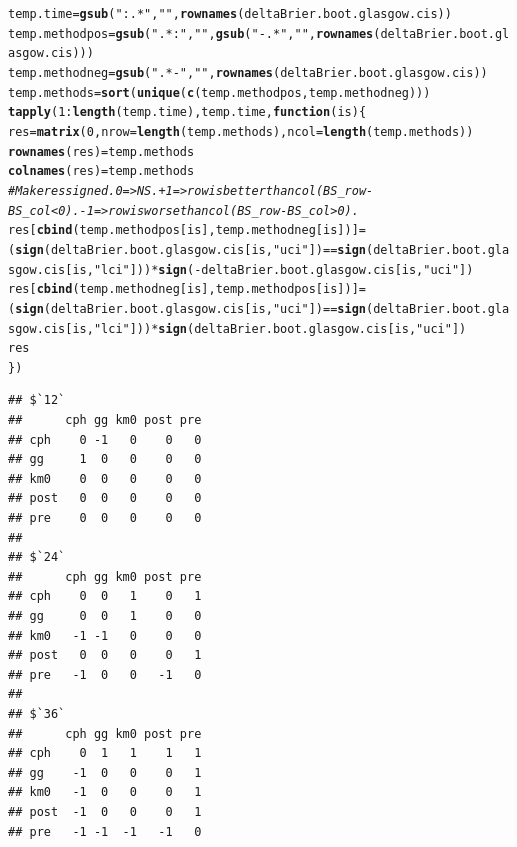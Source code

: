 \documentclass{article}\usepackage[]{graphicx}\usepackage[]{color}
\makeatletter
\newcommand{\hlnum}[1]{\textcolor[rgb]{0.686,0.059,0.569}{#1}}%
\newcommand{\hlstr}[1]{\textcolor[rgb]{0.192,0.494,0.8}{#1}}%
\newcommand{\hlcom}[1]{\textcolor[rgb]{0.678,0.584,0.686}{\textit{#1}}}%
\newcommand{\hlopt}[1]{\textcolor[rgb]{0,0,0}{#1}}%
\newcommand{\hlstd}[1]{\textcolor[rgb]{0.345,0.345,0.345}{#1}}%
\newcommand{\hlkwa}[1]{\textcolor[rgb]{0.161,0.373,0.58}{\textbf{#1}}}%
\newcommand{\hlkwb}[1]{\textcolor[rgb]{0.69,0.353,0.396}{#1}}%
\newcommand{\hlkwc}[1]{\textcolor[rgb]{0.333,0.667,0.333}{#1}}%
\newcommand{\hlkwd}[1]{\textcolor[rgb]{0.737,0.353,0.396}{\textbf{#1}}}%
\newenvironment{kframe}{%
 \def\at@end@of@kframe{}%
 \ifinner\ifhmode%
  \def\at@end@of@kframe{\end{minipage}}%
  \begin{minipage}{\columnwidth}%
 \fi\fi%
 \def\FrameCommand##1{\hskip\@totalleftmargin \hskip-\fboxsep
 \colorbox{shadecolor}{##1}\hskip-\fboxsep
     \hskip-\linewidth \hskip-\@totalleftmargin \hskip\columnwidth}%
 \MakeFramed {\advance\hsize-\width
   \@totalleftmargin\z@ \linewidth\hsize
   \@setminipage}}%
 {\par\unskip\endMakeFramed%
 \at@end@of@kframe}
\newenvironment{knitrout}{}{} %
\makeatother
\begin{document}
\begin{knitrout}
\color{fgcolor}\begin{kframe}
\begin{alltt}
\hlstd{temp.time} \hlkwb{=} \hlkwd{gsub}\hlstd{(}\hlstr{":.*"}\hlstd{,} \hlstr{""}\hlstd{,} \hlkwd{rownames}\hlstd{(deltaBrier.boot.glasgow.cis))}
\hlstd{temp.methodpos} \hlkwb{=} \hlkwd{gsub}\hlstd{(}\hlstr{".*:"}\hlstd{,} \hlstr{""}\hlstd{,} \hlkwd{gsub}\hlstd{(}\hlstr{"-.*"}\hlstd{,} \hlstr{""}\hlstd{,} \hlkwd{rownames}\hlstd{(deltaBrier.boot.glasgow.cis)))}
\hlstd{temp.methodneg} \hlkwb{=} \hlkwd{gsub}\hlstd{(}\hlstr{".*-"}\hlstd{,} \hlstr{""}\hlstd{,} \hlkwd{rownames}\hlstd{(deltaBrier.boot.glasgow.cis))}
\hlstd{temp.methods} \hlkwb{=} \hlkwd{sort}\hlstd{(}\hlkwd{unique}\hlstd{(}\hlkwd{c}\hlstd{(temp.methodpos, temp.methodneg)))}
\hlkwd{tapply}\hlstd{(}\hlnum{1}\hlopt{:}\hlkwd{length}\hlstd{(temp.time), temp.time,} \hlkwa{function}\hlstd{(}\hlkwc{is}\hlstd{) \{}
        \hlstd{res} \hlkwb{=} \hlkwd{matrix}\hlstd{(}\hlnum{0}\hlstd{,} \hlkwc{nrow} \hlstd{=} \hlkwd{length}\hlstd{(temp.methods),} \hlkwc{ncol} \hlstd{=} \hlkwd{length}\hlstd{(temp.methods))}
        \hlkwd{rownames}\hlstd{(res)} \hlkwb{=} \hlstd{temp.methods}
        \hlkwd{colnames}\hlstd{(res)} \hlkwb{=} \hlstd{temp.methods}
        \hlcom{# Make res signed.  0 => NS.  +1 => row is better than col (BS_row - BS_col < 0).  -1 => row is worse than col (BS_row - BS_col > 0).}
        \hlstd{res[}\hlkwd{cbind}\hlstd{(temp.methodpos[is], temp.methodneg[is])]} \hlkwb{=} \hlstd{(}\hlkwd{sign}\hlstd{(deltaBrier.boot.glasgow.cis[is,} \hlstr{"uci"}\hlstd{])} \hlopt{==} \hlkwd{sign}\hlstd{(deltaBrier.boot.glasgow.cis[is,} \hlstr{"lci"}\hlstd{]))} \hlopt{*} \hlkwd{sign}\hlstd{(}\hlopt{-}\hlstd{deltaBrier.boot.glasgow.cis[is,} \hlstr{"uci"}\hlstd{])}
        \hlstd{res[}\hlkwd{cbind}\hlstd{(temp.methodneg[is], temp.methodpos[is])]} \hlkwb{=} \hlstd{(}\hlkwd{sign}\hlstd{(deltaBrier.boot.glasgow.cis[is,} \hlstr{"uci"}\hlstd{])} \hlopt{==} \hlkwd{sign}\hlstd{(deltaBrier.boot.glasgow.cis[is,} \hlstr{"lci"}\hlstd{]))} \hlopt{*} \hlkwd{sign}\hlstd{(deltaBrier.boot.glasgow.cis[is,} \hlstr{"uci"}\hlstd{])}
        \hlstd{res}
\hlstd{\})}
\end{alltt}
\begin{verbatim}
## $`12`
##      cph gg km0 post pre
## cph    0 -1   0    0   0
## gg     1  0   0    0   0
## km0    0  0   0    0   0
## post   0  0   0    0   0
## pre    0  0   0    0   0
## 
## $`24`
##      cph gg km0 post pre
## cph    0  0   1    0   1
## gg     0  0   1    0   0
## km0   -1 -1   0    0   0
## post   0  0   0    0   1
## pre   -1  0   0   -1   0
## 
## $`36`
##      cph gg km0 post pre
## cph    0  1   1    1   1
## gg    -1  0   0    0   1
## km0   -1  0   0    0   1
## post  -1  0   0    0   1
## pre   -1 -1  -1   -1   0
\end{verbatim}
\end{kframe}
\end{knitrout}
\end{document}
